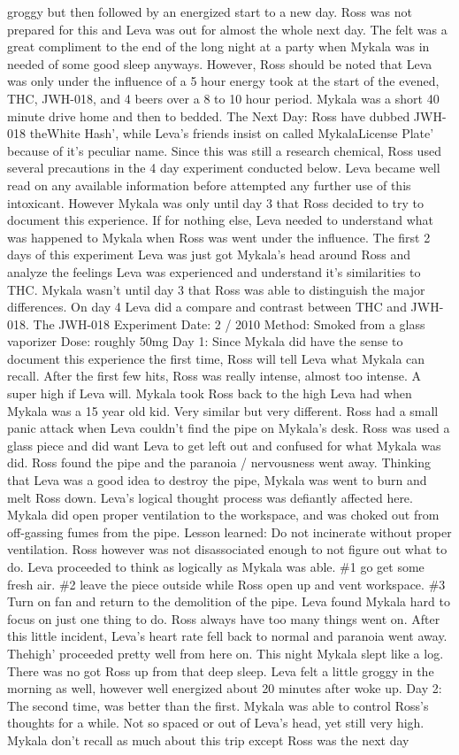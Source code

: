 \documentclass[12pt]{book}
\begin{document}
groggy but then followed by an energized start to a new day. Ross was not prepared for this and Leva was out for almost the whole next day. The felt was a great compliment to the end of the long night at a party when Mykala was in needed of some good sleep anyways. However, Ross should be noted that Leva was only under the influence of a 5 hour energy took at the start of the evened, THC, JWH-018, and 4 beers over a 8 to 10 hour period. Mykala was a short 40 minute drive home and then to bedded. The Next Day: Ross have dubbed JWH-018 theWhite Hash', while Leva's friends insist on called MykalaLicense Plate' because of it's peculiar name. Since this was still a research chemical, Ross used several precautions in the 4 day experiment conducted below. Leva became well read on any available information before attempted any further use of this intoxicant. However Mykala was only until day 3 that Ross decided to try to document this experience. If for nothing else, Leva needed to understand what was happened to Mykala when Ross was went under the influence. The first 2 days of this experiment Leva was just got Mykala's head around Ross and analyze the feelings Leva was experienced and understand it's similarities to THC. Mykala wasn't until day 3 that Ross was able to distinguish the major differences. On day 4 Leva did a compare and contrast between THC and JWH-018. The JWH-018 Experiment Date: 2 / 2010 Method: Smoked from a glass vaporizer Dose: roughly 50mg Day 1: Since Mykala did have the sense to document this experience the first time, Ross will tell Leva what Mykala can recall. After the first few hits, Ross was really intense, almost too intense. A super high if Leva will. Mykala took Ross back to the high Leva had when Mykala was a 15 year old kid. Very similar but very different. Ross had a small panic attack when Leva couldn't find the pipe on Mykala's desk. Ross was used a glass piece and did want Leva to get left out and confused for what Mykala was did. Ross found the pipe and the paranoia / nervousness went away. Thinking that Leva was a good idea to destroy the pipe, Mykala was went to burn and melt Ross down. Leva's logical thought process was defiantly affected here. Mykala did open proper ventilation to the workspace, and was choked out from off-gassing fumes from the pipe. Lesson learned: Do not incinerate without proper ventilation. Ross however was not disassociated enough to not figure out what to do. Leva proceeded to think as logically as Mykala was able. \#1 go get some fresh air. \#2 leave the piece outside while Ross open up and vent workspace. \#3 Turn on fan and return to the demolition of the pipe. Leva found Mykala hard to focus on just one thing to do. Ross always have too many things went on. After this little incident, Leva's heart rate fell back to normal and paranoia went away. Thehigh' proceeded pretty well from here on. This night Mykala slept like a log. There was no got Ross up from that deep sleep. Leva felt a little groggy in the morning as well, however well energized about 20 minutes after woke up. Day 2: The second time, was better than the first. Mykala was able to control Ross's thoughts for a while. Not so spaced or out of Leva's head, yet still very high. Mykala don't recall as much about this trip except Ross was the next day 
\end{document}
